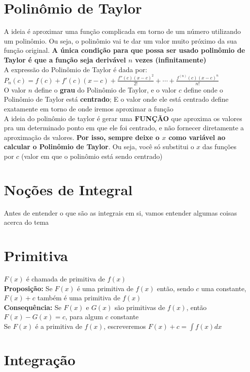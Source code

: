 \documentclass{article}
\begin{document}
\section{Polinômio de Taylor}
A ideia é aproximar uma função complicada em torno de um número utilizando um polinômio. Ou seja, o polinômio vai te dar um valor muito próximo da sua função original. \textbf{A única condição para que possa ser usado polinômio de Taylor é que a função seja derivável $n$ vezes (infinitamente)}
\\[10pt]
A expressão do Polinômio de Taylor é dada por:
\\[10pt]
$P_n(c) = f(c) + f'(c)(x - c) + \frac{f''(c)(x - c)^2}{2!} + \cdots + \frac{f^{(n)}(c)(x - c)^n}{n!}$
\\[10pt]
O valor $n$ define o \textbf{grau} do Polinômio de Taylor, e o valor $c$ define onde o Polinômio de Taylor está \textbf{centrado}; E o valor onde ele está centrado define exatamente em torno de onde iremos aproximar a função
\\[10pt]
A ideia do polinômio de taylor é gerar uma \textbf{FUNÇÃO} que aproxima os valores pra um determinado ponto em que ele foi centrado, e não fornecer diretamente a aproximação ds valores. \textbf{Por isso, sempre deixe o $x$ como variável ao calcular o Polinômio de Taylor}. Ou seja, você só substitui o $x$ das funções por $c$ (valor em que o polinômio está sendo centrado)

\section{Noções de Integral}
Antes de entender o que são as integrais em si, vamos entender algumas coisas acerca do tema

\section{Primitiva}
$F(x)$ é chamada de primitiva de $f(x)$
\\[10pt]
\textbf{Proposição:} Se $F(x)$ é uma primitiva de $f(x)$ então, sendo $c$ uma constante, $F(x) + c$ também é uma primitiva de $f(x)$
\\[5pt]
\textbf{Consequência:} Se $F(x)$ e $G(x)$ são primitivas de $f(x)$, então $F(x) - G(x) = c$, para algum $c$ constante
\\[10pt]
Se $F(x)$ é a primitiva de $f(x)$, escreveremos $F(x) + c = \displaystyle \int f(x)dx$

\section{Integração}
\end{document}
